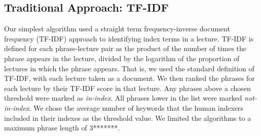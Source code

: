 \subsection{Traditional Approach: TF-IDF}
\label{sec:tfidf}


Our simplest algorithm used a straight term frequency-inverse document
frequency (TF-IDF) approach to identifying index terms in a
lecture. TF-IDF is defined for each phrase-lecture pair as the product
of the number of times the phrase appears in the lecture, divided by
the logarithm of the proportion of lectures in which the phrase
appears. That is, we used the standard definition of TF-IDF, with each
lecture taken as a document. We then ranked the phrases for each
lecture by their TF-IDF score in that lecture. Any phrases above a
chosen threshold were marked as {\em in-index}. All phrases lower in
the list were marked {\em not-in-index}. We chose the average number
of keywords that the human indexers included in their indexes as the
threshold value. We limited the algorithms to a maximum phrase length
of 3*******.


